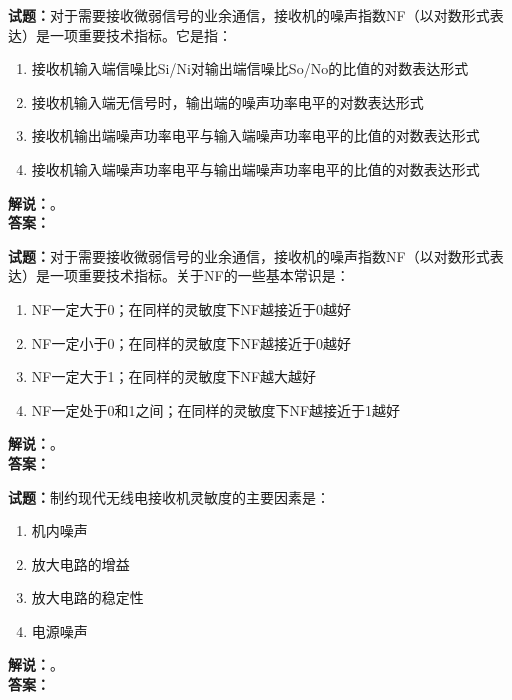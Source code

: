 \documentclass{ctexbook}
\begin{document}
\noindent\textbf{试题：}对于需要接收微弱信号的业余通信，接收机的噪声指数NF（以对数形式表达）是一项重要技术指标。它是指：
\begin{enumerate}[leftmargin=3em]
  \item 接收机输入端信噪比Si/Ni对输出端信噪比So/No的比值的对数表达形式
  \item 接收机输入端无信号时，输出端的噪声功率电平的对数表达形式
  \item 接收机输出端噪声功率电平与输入端噪声功率电平的比值的对数表达形式
  \item 接收机输入端噪声功率电平与输出端噪声功率电平的比值的对数表达形式
\end{enumerate}
\noindent\textbf{解说：}\textbf{}。\\\noindent\textbf{答案：}

\vspace{\baselineskip}

\noindent\textbf{试题：}对于需要接收微弱信号的业余通信，接收机的噪声指数NF（以对数形式表达）是一项重要技术指标。关于NF的一些基本常识是：
\begin{enumerate}[leftmargin=3em]
  \item NF一定大于0；在同样的灵敏度下NF越接近于0越好
  \item NF一定小于0；在同样的灵敏度下NF越接近于0越好
  \item NF一定大于1；在同样的灵敏度下NF越大越好
  \item NF一定处于0和1之间；在同样的灵敏度下NF越接近于1越好
\end{enumerate}
\noindent\textbf{解说：}\textbf{}。\\\noindent\textbf{答案：}

\vspace{\baselineskip}

\noindent\textbf{试题：}制约现代无线电接收机灵敏度的主要因素是：
\begin{enumerate}[leftmargin=3em]
  \item 机内噪声
  \item 放大电路的增益
  \item 放大电路的稳定性
  \item 电源噪声
\end{enumerate}
\noindent\textbf{解说：}\textbf{}。\\\noindent\textbf{答案：}

\vspace{\baselineskip}
\end{document}

